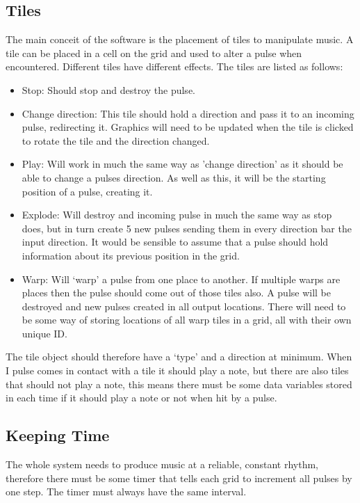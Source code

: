 \documentclass[10pt,a4paper]{article}
\begin{document}
\subsection{Tiles}
The main conceit of the software is the placement of tiles to manipulate music. A tile can be placed in a cell on the grid and used to alter a pulse when encountered. Different tiles have different effects. The tiles are listed as follows:
\begin{itemize}
\item Stop: Should stop and destroy the pulse.

\item Change direction: This tile should hold a direction and pass it to an incoming pulse, redirecting it. Graphics will need to be updated when the tile is clicked to rotate the tile and the direction changed.

\item Play: Will work in much the same way as 'change direction' as it should be able to change a pulses direction. As well as this, it will be the starting position of a pulse, creating it.

\item Explode: Will destroy and incoming pulse in much the same way as stop does, but in turn create 5 new pulses sending them in every direction bar the input direction. It would be sensible to assume that a pulse should hold information about its previous position in the grid.

\item Warp: Will ‘warp’ a pulse from one place to another. If multiple warps are places then the pulse should come out of those tiles also. A pulse will be destroyed and new pulses created in all output locations. There will need to be some way of storing locations of all warp tiles in a grid, all with their own unique ID.
\end{itemize}

\noindent
The tile object should therefore have a ‘type’ and a direction at minimum. When I pulse comes in contact with a tile it should play a note, but there are also tiles that should not play a note, this means there must be some data variables stored in each time if it should play a note or not when hit by a pulse.

\subsection{Keeping Time}
The whole system needs to produce music at a reliable, constant rhythm, therefore there must be some timer that tells each grid to increment all pulses by one step. The timer must always have the same interval.
\end{document}
